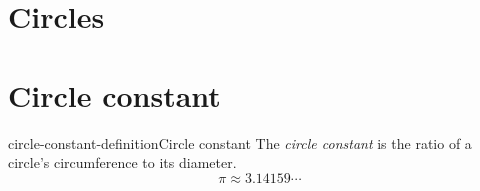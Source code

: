 \documentclass[preview]{standalone}
\begin{document}
\genpage

\section{Circles}

\section{Circle constant}

\begin{snippetdefinition}{circle-constant-definition}{Circle constant}
    The \textit{circle constant} is the ratio of a circle's circumference
    to its diameter.
    \[
        \pi \approx 3.14159\cdots
    \]
\end{snippetdefinition}
\end{document}
